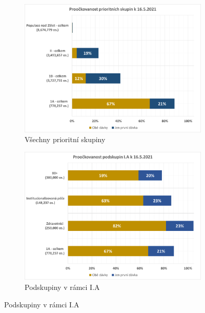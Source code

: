 \begin{figure}
\centering

\begin{subfigure}{0.9\textwidth}
\includegraphics[height=0.3\textheight, width=\textwidth]{assets/proockovanost_vsechnyPS}
\caption{Všechny prioritní skupiny}
\label{proockovanost_ps_vsechny}
\end{subfigure}

\begin{subfigure}{0.9\textwidth}
\includegraphics[height=0.3\textheight, width=\textwidth]{assets/proockovanost_1A}
\caption{Podskupiny v rámci I.A}
\label{proockovanost_ps_1a}
\end{subfigure}


\end{figure}
